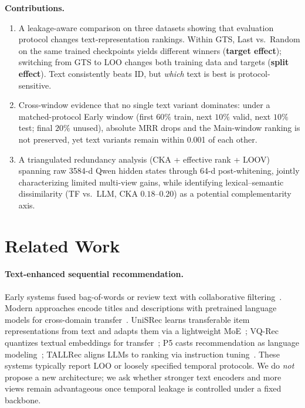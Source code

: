 \documentclass[sigconf,natbib=true,anonymous]{acmart}
\begin{document}
\smallskip\noindent\textbf{Contributions.}
\begin{enumerate}[leftmargin=*,itemsep=1pt]
\item A leakage-aware comparison on three datasets showing that evaluation protocol changes text-representation rankings.  Within GTS, Last vs.\ Random on the same trained checkpoints yields different winners (\textbf{target effect}); switching from GTS to LOO changes both training data and targets (\textbf{split effect}).  Text consistently beats ID, but \emph{which} text is best is protocol-sensitive.
\item Cross-window evidence that no single text variant dominates: under a matched-protocol Early window (first $60\%$ train, next $10\%$ valid, next $10\%$ test; final $20\%$ unused), absolute MRR drops and the Main-window ranking is not preserved, yet text variants remain within 0.001 of each other.
\item A triangulated redundancy analysis (CKA + effective rank + LOOV) spanning raw 3584-d Qwen hidden states through 64-d post-whitening, jointly characterizing limited multi-view gains, while identifying lexical--semantic dissimilarity (TF vs.\ LLM, CKA $0.18$--$0.20$) as a potential complementarity axis.
\end{enumerate}

\section{Related Work}
\label{sec:related}

\paragraph{Text-enhanced sequential recommendation.}
Early systems fused bag-of-words or review text with collaborative filtering~\cite{wang2015cdl,salton1988termweighting}.
Modern approaches encode titles and descriptions with pretrained language models for cross-domain transfer~\cite{hou2022unisrec,hou2023vqrec,geng2022p5,bao2023tallrec}.
UniSRec learns transferable item representations from text and adapts them via a lightweight MoE~\cite{hou2022unisrec}; VQ-Rec quantizes textual embeddings for transfer~\cite{hou2023vqrec}; P5 casts recommendation as language modeling~\cite{geng2022p5}; TALLRec aligns LLMs to ranking via instruction tuning~\cite{bao2023tallrec}.
These systems typically report LOO or loosely specified temporal protocols.
We do \emph{not} propose a new architecture; we ask whether stronger text encoders and more views remain advantageous once temporal leakage is controlled under a fixed backbone.
\end{document}
